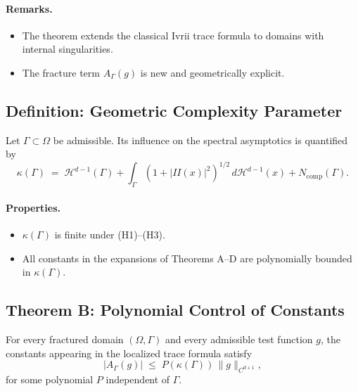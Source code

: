 \paragraph{Remarks.}
\begin{itemize}
  \item The theorem extends the classical Ivrii trace formula to domains with
  internal singularities.
  \item The fracture term $A_\Gamma(g)$ is new and geometrically explicit.
\end{itemize}

\subsection{Definition: Geometric Complexity Parameter}

\begin{definition}
Let $\Gamma\subset\Omega$ be admissible. Its influence on the spectral
asymptotics is quantified by
\[
\kappa(\Gamma) \;=\;
\mathcal{H}^{d-1}(\Gamma)
+ \int_\Gamma (1+|II(x)|^2)^{1/2}\, d\mathcal{H}^{d-1}(x)
+ N_{\mathrm{comp}}(\Gamma).
\]
\end{definition}

\paragraph{Properties.}
\begin{itemize}
  \item $\kappa(\Gamma)$ is finite under (H1)--(H3).
  \item All constants in the expansions of Theorems A--D are polynomially
  bounded in $\kappa(\Gamma)$.
\end{itemize}

\subsection{Theorem B: Polynomial Control of Constants}

\begin{proposition}
For every fractured domain $(\Omega,\Gamma)$ and every admissible test function
$g$, the constants appearing in the localized trace formula satisfy
\[
|A_\Gamma(g)| \;\leq\; P(\kappa(\Gamma))\,\|g\|_{C^{d+1}},
\]
for some polynomial $P$ independent of $\Gamma$.
\end{proposition}

